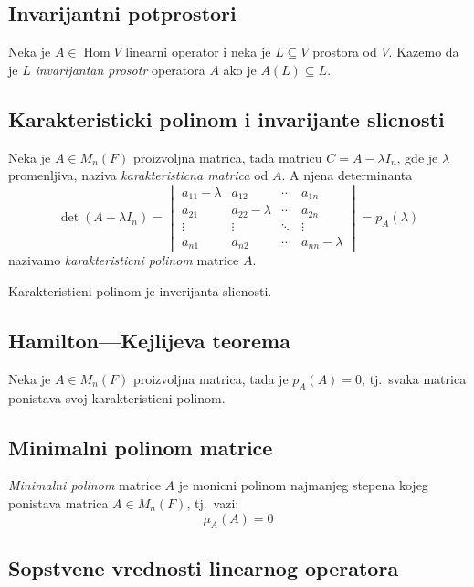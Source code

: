 \documentclass[12p,a4paper]{article}
\DeclareMathOperator{\Hom}{Hom}
\begin{document}
\begin{multicols}{2}
\subsection{Invarijantni potprostori}

    Neka je $A \in \Hom V$ linearni operator i neka je $L \subseteq V$ 
    prostora od $V$. Kazemo da je $L$ \textit{invarijantan prosotr} operatora 
    $A$ ako je $A(L) \subseteq L$.

\subsection{Karakteristicki polinom i invarijante slicnosti}

    Neka je $A \in M_n(F)$ proizvoljna matrica, tada matricu 
    $C = A - \lambda I_n$, gde je $\lambda$ promenljiva, naziva 
    \textit{karakteristicna matrica} od $A$. A njena determinanta
    \[
        \det (A - \lambda I_n) = 
        \begin{vmatrix}
            a_{11} - \lambda & a_{12} & \cdots & a_{1n} \\
            a_{21} & a_{22} - \lambda & \cdots & a_{2n} \\
            \vdots & \vdots & \ddots & \vdots \\
            a_{n1} & a_{n2} & \cdots & a_{nn} - \lambda
        \end{vmatrix}
        = p_A (\lambda)
    \]
    nazivamo \textit{karakteristicni polinom} matrice $A$.

    Karakteristicni polinom je inverijanta slicnosti.

\subsection{Hamilton---Kejlijeva teorema}

    Neka je $A \in M_n(F)$ proizvoljna matrica, tada je $p_A (A) = 0$, tj.\ 
    svaka matrica ponistava svoj karakteristicni polinom.

\subsection{Minimalni polinom matrice}

    \textit{Minimalni polinom} matrice $A$ je monicni polinom najmanjeg 
    stepena kojeg ponistava matrica $A \in M_n(F)$, tj.\ vazi:
    \[\mu_A (A) = 0\]

\subsection{Sopstvene vrednosti linearnog operatora}


\end{multicols}
\end{document}

